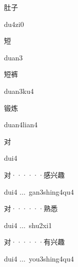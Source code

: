 \begin{verbete}[du4zi0]{肚子}
\begin{pronuncia}{du4zi0}
\end{pronuncia}
\end{verbete}

\begin{verbete}[duan3]{短}
\begin{pronuncia}{duan3}
\end{pronuncia}
\end{verbete}

\begin{verbete}[duan3ku4]{短裤}
\begin{pronuncia}{duan3ku4}
\end{pronuncia}
\end{verbete}

\begin{verbete}{锻炼}
\begin{pronuncia}{duan4lian4}
\end{pronuncia}
\end{verbete}

\begin{verbete}[dui4]{对}
\begin{pronuncia}{dui4}
\end{pronuncia}
\end{verbete}

\begin{verbete}{对······感兴趣}
\begin{pronuncia}[\\]{dui4 ...\  gan3shing4qu4}
\end{pronuncia}
\end{verbete}

\begin{verbete}{对······熟悉}
\begin{pronuncia}{dui4 ...\  shu2xi1}
\end{pronuncia}
\end{verbete}

\begin{verbete}{对······有兴趣}
\begin{pronuncia}[\\]{dui4 ...\  you3shing4qu4}
\end{pronuncia}
\end{verbete}

